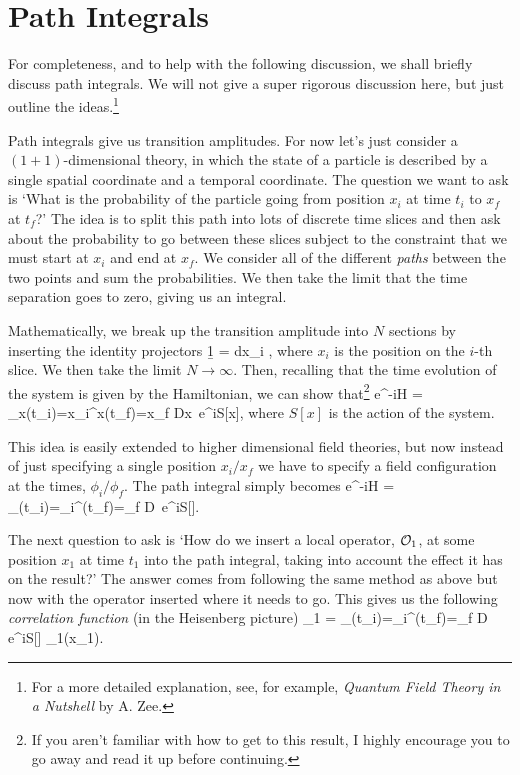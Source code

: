 \section{Path Integrals}

For completeness, and to help with the following discussion, we shall briefly discuss path integrals. We will not give a super rigorous discussion here, but just outline the ideas.\footnote{For a more detailed explanation, see, for example, \textit{Quantum Field Theory in a Nutshell} by A. Zee.}

Path integrals give us transition amplitudes. For now let's just consider a $(1+1)$-dimensional theory, in which the state of a particle is described by a single spatial coordinate and a temporal coordinate. The question we want to ask is `What is the probability of the particle going from position $x_i$ at time $t_i$ to $x_f$ at $t_f$?' The idea is to split this path into lots of discrete time slices and then ask about the probability to go between these slices subject to the constraint that we must start at $x_i$ and end at $x_f$. We consider all of the different \textit{paths} between the two points and sum the probabilities. We then take the limit that the time separation goes to zero, giving us an integral. 

Mathematically, we break up the transition amplitude into $N$ sections by inserting the identity projectors 
\be
\label{eqn:BasesStates}
    \b1 = \int dx_i ,
\ee 
where $x_i$ is the position on the $i$-th slice. We then take the limit $N\to\infty$. Then, recalling that the time evolution of the system is given by the Hamiltonian, we can show that\footnote{If you aren't familiar with how to get to this result, I highly encourage you to go away and read it up before continuing.} 
\bse 
     e^{-iH} = \int_{x(t_i)=x_i}^{x(t_f)=x_f} Dx\, e^{iS[x]},
\ese 
where $S[x]$ is the action of the system. 

This idea is easily extended to higher dimensional field theories, but now instead of just specifying a single position $x_i/x_f$ we have to specify a field configuration at the times, $\phi_i/\phi_f$. The path integral simply becomes 
\bse 
     e^{-iH} = \int_{\phi(t_i)=\phi_i}^{\phi(t_f)=\phi_f} D\phi \, e^{iS[\phi]}.
\ese 

The next question to ask is `How do we insert a local operator, $\mathcal{O}_1$, at some position $x_1$ at time $t_1$ into the path integral, taking into account the effect it has on the result?' The answer comes from following the same method as above but now with the operator inserted where it needs to go. This gives us the following \textit{correlation function} (in the Heisenberg picture) 
\bse 
     \cO_1  = \int_{\phi(t_i)=\phi_i}^{\phi(t_f)=\phi_f} D\phi \, e^{iS[\phi]} \cO_1(x_1).
\ese 

